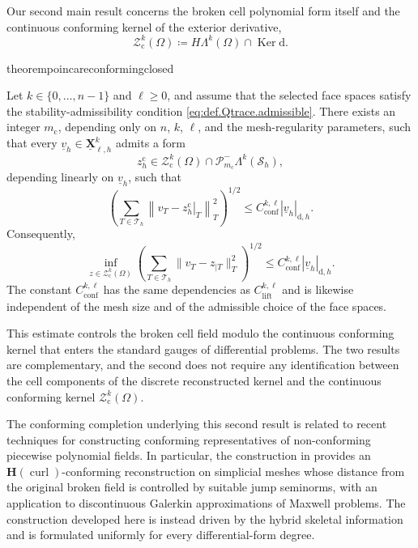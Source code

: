 \documentclass[a4paper,11pt]{article}
\theoremstyle{definition}
\newcommand{\DIFF}{\mathrm{d}}
\newcommand{\Sh}{\mathcal{S}_h}
\newcommand{\PLtrim}[2]{\mathcal{P}_{#1}^{-}\Lambda^{#2}}
\newcommand{\uXh}[1]{\underline{\boldsymbol{X}}_{\ell,h}^{#1}}
\newcommand{\Ker}{\operatorname{Ker}}
\begin{document}
Our second main result concerns the broken cell polynomial form itself and the continuous conforming kernel of the exterior derivative,
\begin{equation}\label{eq:def.conforming.closed.space}
  \mathcal Z_{\mathrm c}^k(\Omega)
  \coloneqq
  H\Lambda^k(\Omega)
  \cap
  \Ker\DIFF.
\end{equation}
\begin{restatable}{theorem}{poincareconformingclosed}
\label{thm:poincare.conforming.closed}

Let $k\in\{0,\ldots,n-1\}$ and $\ell\geq0$, and assume that the selected face spaces satisfy the stability-admissibility condition \eqref{eq:def.Qtrace.admissible}.
There exists an integer $m_{\mathrm c}$, depending only on $n$, $k$, $\ell$, and the mesh-regularity parameters, such that every $\underline v_h\in\uXh{k}$ admits a form
\[
  z_h^{\mathrm c}
  \in\mathcal Z_{\mathrm c}^k(\Omega)\cap\PLtrim{m_{\mathrm c}}{k}(\Sh),
\]
depending linearly on $\underline v_h$, such that
\begin{equation}
\label{eq:poincare.conforming.closed.representative}
  \left(
    \sum_{T\in\mathcal T_h}
    \left\|
      v_T-\left.z_h^{\mathrm c}\right|_T
    \right\|_T^2
  \right)^{1/2}
  \leq
  C_{\mathrm{conf}}^{k,\ell}
  |\underline v_h|_{\DIFF,h}.
\end{equation}
Consequently,
\begin{equation}
\label{eq:poincare.modulo.conforming.closed.space}
  \inf_{z\in\mathcal Z_{\mathrm c}^k(\Omega)}
  \left(
    \sum_{T\in\mathcal T_h}
    \|v_T-z_{|T}\|_T^2
  \right)^{1/2}
  \leq
  C_{\mathrm{conf}}^{k,\ell}
  |\underline v_h|_{\DIFF,h}.
\end{equation}
The constant $C_{\mathrm{conf}}^{k,\ell}$ has the same dependencies as $C_{\mathrm{lift}}^{k,\ell}$ and is likewise independent of the mesh size and of the admissible choice of the face spaces.
\end{restatable}

This estimate controls the broken cell field modulo the continuous conforming kernel that enters the standard gauges of differential problems.
The two results are complementary, and the second does not require any identification between the cell components of the discrete reconstructed kernel and the continuous conforming kernel $\mathcal Z_{\mathrm c}^k(\Omega)$.

The conforming completion underlying this second result is related to recent techniques for constructing conforming representatives of non-conforming piecewise polynomial fields.
In particular, the construction in \cite{Dong.Ern:26} provides an $\boldsymbol H(\operatorname{curl})$-conforming reconstruction on simplicial meshes whose distance from the original broken field is controlled by suitable jump seminorms, with an application to discontinuous Galerkin approximations of Maxwell problems.
The construction developed here is instead driven by the hybrid skeletal information and is formulated uniformly for every differential-form degree.
\end{document}
